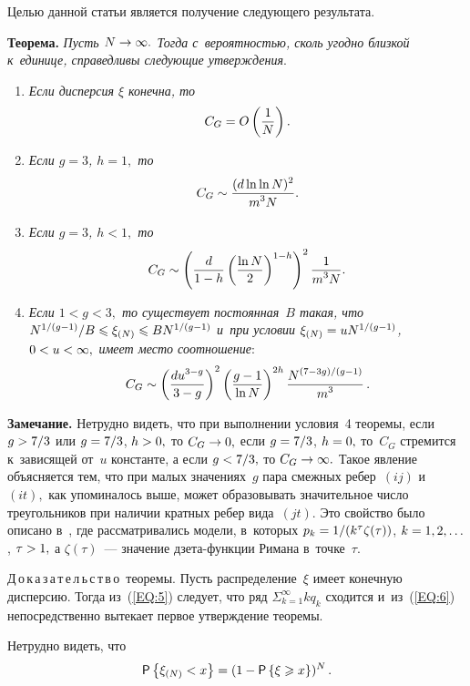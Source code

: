 \begin{multicols}{2}
Целью данной статьи является получение следующего результата.

\smallskip

\noindent
\textbf{Теорема.} \textit{Пусть $N\hm\rightarrow \infty.$ Тогда 
с~вероятностью, сколь угодно близкой к~единице,
справедливы сле\-ду\-ющие утверждения}.
\begin{enumerate}
\item \textit{Если дисперсия $\xi$ конечна, то} 
$$
C_G=O\left(\displaystyle\frac{\displaystyle 1\mathstrut}{\displaystyle N\mathstrut}\right).
$$
\item \textit{Если $g=3$, $h=1,$ то}
$$
C_G\sim \displaystyle\frac{\displaystyle (d\ln \ln N)^2\mathstrut}{\displaystyle {m^3N}\mathstrut}.
$$
\item \textit{Если $g=3$, $h<1,$ то}
$$
C_G\sim 
\left (\displaystyle\frac{\displaystyle d\mathstrut}{\displaystyle 1-h\mathstrut}\left (\displaystyle\frac{\displaystyle \ln N\mathstrut}{\displaystyle 2\mathstrut}\right)^{1-h}\right)^2 
\displaystyle\frac{\displaystyle 1\mathstrut}{\displaystyle m^3N\mathstrut}.
$$
\item \textit{Если $1<g<3,$ то существует постоянная~$B$ такая, 
что $N^{{1}/({g-1})}/B \hm\leqslant \xi_{(N)}\hm \leqslant 
BN^{{1}/({g-1})}$ и~при условии $\xi_{(N)}\hm=
uN^{{1}/({g-1})}$, $0\hm<u\hm<\infty,$ имеет место соотношение}:
    $$
    C_G\sim \left(\displaystyle\frac{\displaystyle du^{3-g}\mathstrut}{\displaystyle 3-g\mathstrut}\right)^2 \left( 
    \displaystyle\frac{\displaystyle g-1\mathstrut}{\displaystyle \ln N\mathstrut}\right)^{2h}\displaystyle\frac{\displaystyle N^{({7-3g})/({g-1})}\mathstrut}{\displaystyle m^3\mathstrut}\,.
    $$
\end{enumerate}

\noindent
\textbf{Замечание.} 
Нетрудно видеть, что при выполнении условия~4 теоремы, если $g\hm>7/3$ или 
$g\hm=7/3$, $h\hm>0,$ то $C_G\hm\rightarrow 0,$ если $g\hm=7/3$, $h\hm=0,$ то~$C_G$ 
стремится к~зависящей от~$u$ константе, а если $g\hm<7/3,$ то 
$C_G\hm\rightarrow \infty.$ Такое явление объясняется тем, что при малых значениях~$g$ 
пара смежных ребер~$(ij)$ и~$(it),$ как упоминалось выше, может образовывать 
значительное число треугольников при наличии кратных ребер вида~$(jt).$ 
Это свойство было описано в~\cite{New}, где рассматривались модели, 
в~которых $p_k\hm=1/(k^\tau \zeta (\tau))$, $k\hm=1,2,\ldots$,
$\tau\hm >1,$ а $\zeta (\tau)$~--- значение дзе\-та-функ\-ции Римана в~точке~$\tau.$

\noindent
Д\,о\,к\,а\,з\,а\,т\,е\,л\,ь\,с\,т\,в\,о\  теоремы. 
Пусть распределение~$\xi$ имеет конечную дисперсию. Тогда из~(\ref{EQ:5}) 
следует, что ряд $\Sigma_{k=1}^\infty kq_k$
сходится и~из~(\ref{EQ:6}) непосредственно вытекает первое утверждение теоремы.

Нетрудно видеть, что
\begin{equation}
\label{EQ:10}
{\sf P}\left\{\xi_{(N)}<x\right\} =(1-{\sf P}\left\{\xi\geqslant x\right\})^N\,.
\end{equation}



\end{multicols}
